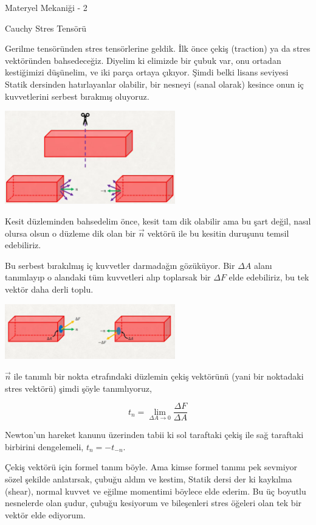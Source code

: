 \documentclass[12pt,fleqn]{article}\usepackage{../../common}
\begin{document}
Materyel Mekaniği - 2

Cauchy Stres Tensörü

Gerilme tensöründen stres tensörlerine geldik. İlk önce çekiş (traction) ya da
stres vektöründen bahsedeceğiz. Diyelim ki elimizde bir çubuk var, onu ortadan
kestiğimizi düşünelim, ve iki parça ortaya çıkıyor. Şimdi belki lisans seviyesi
Statik dersinden hatırlayanlar olabilir, bir nesneyi (sanal olarak) kesince onun
iç kuvvetlerini serbest bırakmış oluyoruz. 

\includegraphics[width=20em]{phy_020_strs_02_01.png}

Kesit düzleminden bahsedelim önce, kesit tam dik olabilir ama bu şart değil,
nasıl olursa olsun o düzleme dik olan bir $\vec{n}$ vektörü ile bu kesitin
duruşunu temsil edebiliriz. 

Bu serbest bırakılmış iç kuvvetler darmadağın gözüküyor. Bir $\Delta A$
alanı tanımlayıp o alandaki tüm kuvvetleri alıp toplarsak bir $\Delta F$
elde edebiliriz, bu tek vektör daha derli toplu.

\includegraphics[width=20em]{phy_020_strs_02_02.png}

$\vec{n}$ ile tanımlı bir nokta etrafındaki düzlemin çekiş vektörünü (yani bir
noktadaki stres vektörü) şimdi şöyle tanımlıyoruz,

$$
t_n = \lim_{\Delta A \to 0} \frac{\Delta F}{\Delta A}
$$

Newton'un hareket kanunu üzerinden tabii ki sol taraftaki çekiş ile sağ
taraftaki birbirini dengelemeli, $t_n = -t_{-n}$.

Çekiş vektörü için formel tanım böyle. Ama kimse formel tanımı pek sevmiyor
sözel şekilde anlatırsak, çubuğu aldım ve kestim, Statik dersi der ki kaykılma
(shear), normal kuvvet ve eğilme momentimi böylece elde ederim. Bu üç boyutlu
nesnelerde olan şudur, çubuğu kesiyorum ve bileşenleri stres öğeleri olan tek
bir vektör elde ediyorum.
\end{document}
